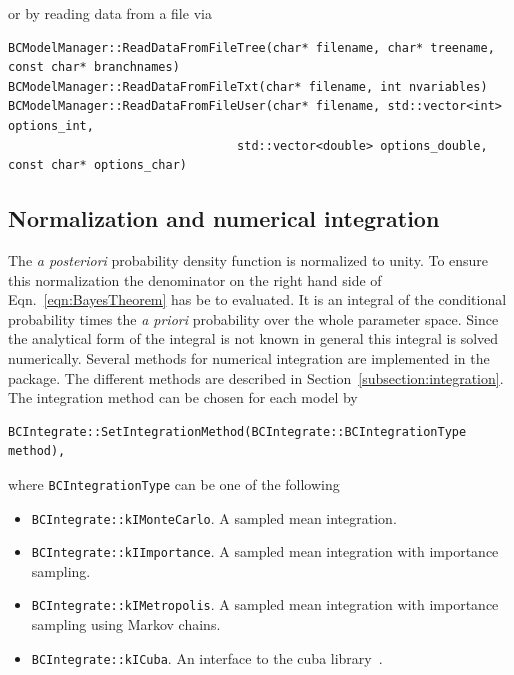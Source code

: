 \documentclass[11pt, a4paper]{article}
\begin{document}
\noindent 
or by reading data from a file via 
%
\begin{small}
\begin{verbatim}
BCModelManager::ReadDataFromFileTree(char* filename, char* treename, const char* branchnames)
BCModelManager::ReadDataFromFileTxt(char* filename, int nvariables)
BCModelManager::ReadDataFromFileUser(char* filename, std::vector<int> options_int,
                                std::vector<double> options_double, const char* options_char)
\end{verbatim} 
\end{small} 


\subsection{Normalization and numerical integration} 
\label{section:normalization} 

The {\it a posteriori} probability density function is normalized to
unity. To ensure this normalization the denominator on the right hand
side of Eqn.~\ref{eqn:BayesTheorem} has be to evaluated. It is an
integral of the conditional probability times the {\it a priori}
probability over the whole parameter space. Since the analytical form
of the integral is not known in general this integral is solved
numerically. Several methods for numerical integration are implemented
in the package. The different methods are described in
Section~\ref{subsection:integration}. \\

\noindent 
The integration method can be chosen for each model by 
%
\begin{verbatim}
BCIntegrate::SetIntegrationMethod(BCIntegrate::BCIntegrationType method), 
\end{verbatim} 

\noindent
where \verb|BCIntegrationType| can be one of the following 
% 
\begin{itemize}
\item \verb|BCIntegrate::kIMonteCarlo|. A sampled mean integration.
\item \verb|BCIntegrate::kIImportance|. A sampled mean integration
 with importance sampling.  
\item \verb|BCIntegrate::kIMetropolis|. A sampled mean integration
 with importance sampling using Markov chains. 
\item \verb|BCIntegrate::kICuba|. An interface to the cuba
 library~\cite{Hahn:2004fe}.
\end{itemize}
\end{document}
